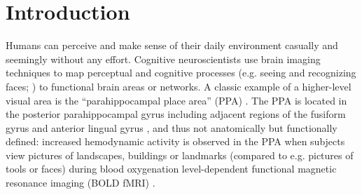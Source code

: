 \documentclass[english]{article}
\begin{document}


\section{Introduction}




Humans can perceive and make sense of their daily environment casually and
seemingly without any effort. Cognitive neuroscientists use brain imaging
techniques to map perceptual and cognitive processes (e.g. seeing and
recognizing faces; \citep{kanwisher1997ffa}) to functional brain areas or
networks.
A classic example of a higher-level visual area is the ``parahippocampal place
area'' (PPA) \citep{epstein1998ppa, epstein1999parahippocampal}.
The PPA is located in the posterior parahippocampal gyrus including adjacent
regions of the fusiform gyrus and anterior lingual gyrus
\citep{epstein2008parahippocampal}, and thus not anatomically but functionally
defined:
increased hemodynamic activity is observed in the PPA when subjects view
pictures of landscapes, buildings or landmarks (compared to e.g. pictures of
tools or faces) during blood oxygenation level-dependent functional magnetic
resonance imaging (BOLD fMRI) \citep{aguirre1998area, epstein2014neural,
epstein1998ppa}.
\end{document}
